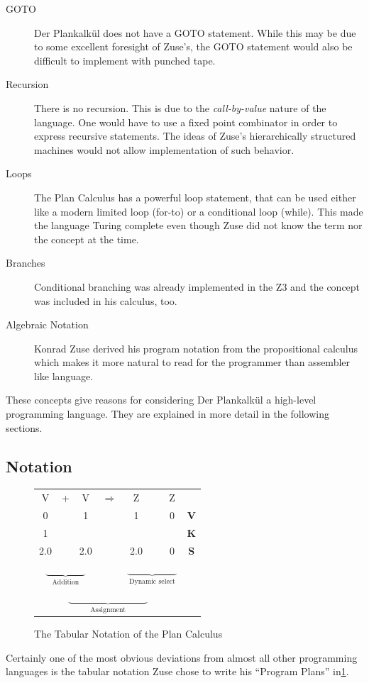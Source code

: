 \documentclass{llncs}
\begin{document}
   \begin{description}
     \item[GOTO] Der Plankalkül does not have 
       a GOTO statement. While this may be due to some excellent
       foresight of Zuse's, the GOTO statement would also be
       difficult to implement with punched tape.
     \item[Recursion] There is no recursion.
       This is due to the \emph{call-by-value} nature of the 
       language. One would have to use a fixed point combinator
       in order to express recursive statements. The 
       ideas of Zuse's hierarchically structured machines would not 
       allow implementation of such behavior.
     \item[Loops] The Plan Calculus has a powerful loop statement, 
       that can be used either like a modern limited loop (for-to) 
       or a conditional loop (while). This made the language Turing
       complete even though Zuse did not know the term nor the 
       concept at the time.
     \item[Branches] Conditional branching was already implemented 
       in the Z3 and the concept was included in his calculus, too.
     \item[Algebraic Notation] Konrad Zuse derived his program 
       notation from the propositional calculus which makes
       it more natural to read for the programmer than assembler like 
       language.
   \end{description}
   These concepts give reasons for considering Der Plankalkül a
   high-level programming language. They are explained in more detail 
   in the following sections.
 \subsection{Notation}
 \begin{figure}[tb]
   \begin{center}
     \begin{tabular}[bt]{c c c c c c c | c}
       V & + & V & $\Rightarrow$ & Z & {\LARGE\multirow{3}{*}{$\swarrow$}} & Z & ~\\
       0 &   & 1 &               & 1 &   & 0 & {\bf V}\\
       1 &   &   &               &   & &   & {\bf K}\\
       2.0 & & 2.0 &             & 2.0 & & 0 & {\bf S} \\
       \multicolumn{3}{c}{$\underbrace{\qquad\qquad}_{\text{Addition}}$}
       	& & \multicolumn{3}{c}{$\underbrace{\qquad\qquad\quad}_{\text{Dynamic select}}$} \\
	\multicolumn{7}{c}{$\underbrace{\qquad\qquad\qquad\qquad}_{\text{Assignment}}$} &
     \end{tabular}
   \end{center}
   \caption{The Tabular Notation of the Plan Calculus}
   \label{fig:notation}
 \end{figure}
   Certainly one of the most obvious deviations from almost all other programming 
   languages is the tabular notation Zuse chose to write his ``Program Plans'' in\ref{fig:notation}. 
   
\end{document}
